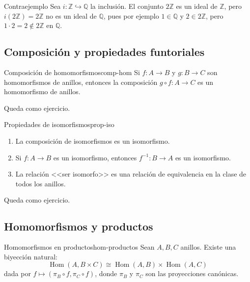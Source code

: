 \begin{example}{Contraejemplo}{}
    Sea \(i: \mathbb{Z} \hookrightarrow \mathbb{Q}\) la inclusión. El conjunto \(2\mathbb{Z}\) es un ideal de \(\mathbb{Z}\), pero \(i(2\mathbb{Z}) = 2\mathbb{Z}\) no es un ideal de \(\mathbb{Q}\), pues por ejemplo \(1 \in \mathbb{Q}\) y \(2 \in 2\mathbb{Z}\), pero \(1 \cdot 2 = 2 \notin 2\mathbb{Z}\) en \(\mathbb{Q}\).
\end{example}

\subsection{Composición y propiedades funtoriales}

\begin{proposition}{Composición de homomorfismos}{comp-hom}
    Si \(f: A \to B\) y \(g: B \to C\) son homomorfismos de anillos, entonces la composición \(g \circ f: A \to C\) es un homomorfismo de anillos.
\end{proposition}

\begin{proofbox}
    Queda como ejercicio.
\end{proofbox}

\begin{proposition}{Propiedades de isomorfismos}{prop-iso}
    \begin{enumerate}
        \item La composición de isomorfismos es un isomorfismo.
        \item Si \(f: A \to B\) es un isomorfismo, entonces \(f^{-1}: B \to A\) es un isomorfismo.
        \item La relación <<ser isomorfo>> es una relación de equivalencia en la clase de todos los anillos.
    \end{enumerate}
\end{proposition}

\begin{proofbox}
    Queda como ejercicio.
\end{proofbox}

\subsection{Homomorfismos y productos}

\begin{theorem}{Homomorfismos en productos}{hom-productos}
    Sean \(A, B, C\) anillos. Existe una biyección natural:
    \[
    \operatorname{Hom}(A, B \times C) \cong \operatorname{Hom}(A, B) \times \operatorname{Hom}(A, C)
    \]
    dada por \(f \mapsto (\pi_B \circ f, \pi_C \circ f)\), donde \(\pi_B\) y \(\pi_C\) son las proyecciones canónicas.
\end{theorem}

